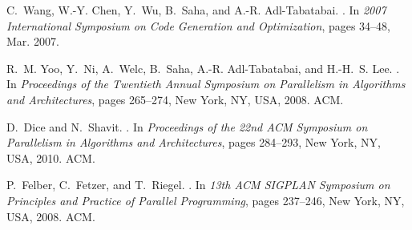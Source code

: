\documentclass[preprint]{sigplanconf}
\begin{document}
\begin{thebibliography}{10}
    C.~Wang, W.-Y. Chen, Y.~Wu, B.~Saha, and A.-R. Adl-Tabatabai.
    .
    \newblock In \emph{2007 International Symposium on Code Generation and
    Optimization}, pages 34--48, Mar. 2007.

    R.~M. Yoo, Y.~Ni, A.~Welc, B.~Saha, A.-R. Adl-Tabatabai, and H.-H.~S. Lee.
    .
    \newblock In \emph{Proceedings of the Twentieth Annual Symposium on Parallelism
    in Algorithms and Architectures}, pages 265--274, New York, NY, USA, 2008.
    ACM.

    D.~Dice and N.~Shavit.
    .
    \newblock In \emph{Proceedings of the 22nd ACM Symposium on Parallelism in
    Algorithms and Architectures}, pages 284--293, New York, NY, USA, 2010. ACM.

    P.~Felber, C.~Fetzer, and T.~Riegel.
    .
    \newblock In \emph{13th ACM SIGPLAN Symposium on Principles and Practice of
    Parallel Programming}, pages 237--246, New York, NY, USA, 2008. ACM.

\end{thebibliography}
\end{document}
